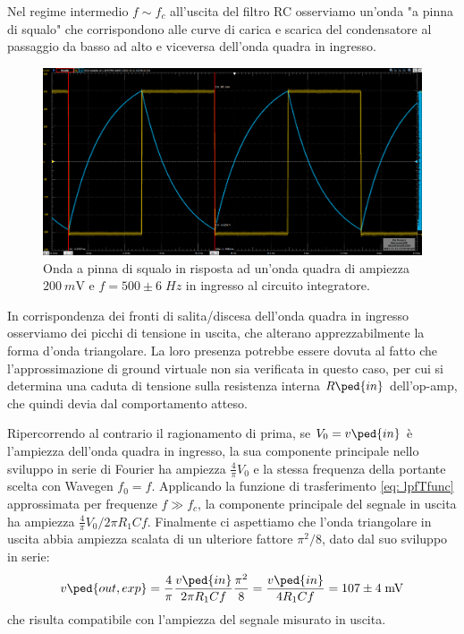 \documentclass[10pt, a4paper, italian]{article}
\begin{document}
Nel regime intermedio $f \sim f_c$ all'uscita del filtro RC osserviamo un'onda
"a pinna di squalo" che corrispondono alle curve di carica e scarica del
condensatore al passaggio da basso ad alto e viceversa dell'onda quadra in
ingresso.
\begin{figure}[htbp]
\centering
\includegraphics[scale=0.335]{intfin}
\caption{Onda a pinna di squalo in risposta ad un'onda quadra di ampiezza
$\SI{200}{m\V}$ e $f = 500 \pm 6 \; \si{Hz}$ in ingresso al circuito
integratore. \label{fig: intfin}}
\end{figure}

In corrispondenza dei fronti di salita/discesa dell'onda quadra in ingresso
osserviamo dei picchi di tensione in uscita, che alterano apprezzabilmente
la forma d'onda triangolare. La loro presenza potrebbe essere dovuta al fatto
che l'approssimazione di ground virtuale non sia verificata in questo caso,
per cui si determina una caduta di tensione sulla resistenza interna
$R\ped{in}$ dell'op-amp, che quindi devia dal comportamento atteso.

Ripercorrendo al contrario il ragionamento di prima, se $V_0 = v\ped{in}$ è
l'ampiezza dell'onda quadra in ingresso, la sua componente principale nello
sviluppo in serie di Fourier ha ampiezza $\frac{4}{\pi} V_0$ e la stessa
frequenza della portante scelta con Wavegen $f_0 = f$.
Applicando la funzione di trasferimento \eqref{eq: lpfTfunc} approssimata per
frequenze $f \gg f_c$, la componente principale del segnale in uscita ha
ampiezza $\frac{4}{\pi} V_0 / 2\pi R_1 C f$. Finalmente ci aspettiamo che
l'onda triangolare in uscita abbia ampiezza scalata di un ulteriore fattore
$\pi^2/8$, dato dal suo sviluppo in serie:
\[
v\ped{out, exp} = \frac{4}{\pi} \frac{v\ped{in}}{2 \pi R_1 C f} \frac{\pi^2}{8} =
\frac{v\ped{in}}{4 R_1 C f} = 107 \pm 4 \; \si{m\V}
\]
che risulta compatibile con l'ampiezza del segnale misurato in uscita.
\end{document}
